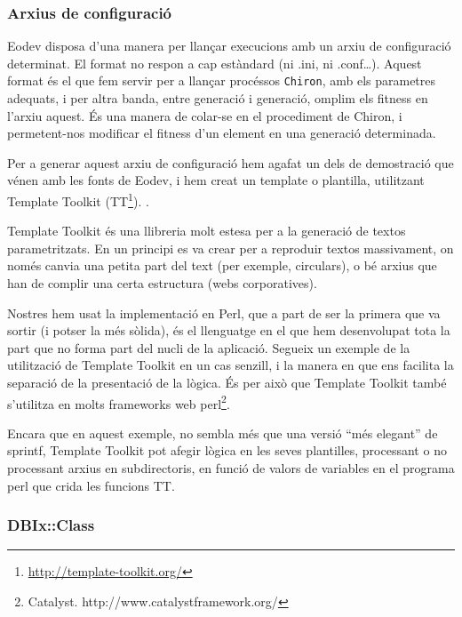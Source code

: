 \subsubsection{Arxius de configuració} %
\label{ssub:Arxius de configuracio}

Eodev disposa d'una manera per llançar execucions amb un arxiu de configuració
determinat.  El format no respon a cap estàndard (ni .ini, ni .conf\ldots).
Aquest format és el que fem servir per a llançar procéssos \texttt{Chiron}, amb
els parametres adequats, i per altra banda, entre generació i generació, omplim
els fitness en l'arxiu aquest.  És una manera de colar-se en el procediment de
Chiron, i permetent-nos modificar el fitness d'un element en una generació
determinada.

Per a generar aquest arxiu de configuració hem agafat un dels de demostració que
vénen amb les fonts de Eodev, i hem creat un template o plantilla, utilitzant
Template Toolkit (TT\footnote{\url{http://template-toolkit.org/}}).
\cite{CCW03}.

Template Toolkit és una llibreria molt estesa per a la generació de textos
parametritzats.  En un principi es va crear per a reproduir textos massivament,
on només canvia una petita part del text (per exemple, circulars), o bé arxius
que han de complir una certa estructura (webs corporatives).

Nostres hem usat la implementació en Perl, que a part de ser la primera que va
sortir (i potser la més sòlida), és el llenguatge en el que hem desenvolupat
tota la part que no forma part del nucli de la aplicació.  Segueix un exemple de
la utilització de Template Toolkit en un cas senzill, i la manera en que ens
facilita la separació de la presentació de la lògica.  És per això que Template
Toolkit també s'utilitza en molts frameworks web perl\footnote{Catalyst.
http://www.catalystframework.org/}.

\lstset{language=perl, tabsize=2}
\lstset{commentstyle=\textit}


Encara que en aquest exemple, no sembla més que una versió ``més elegant'' de
sprintf, Template Toolkit pot afegir lògica en les seves plantilles, processant
o no processant arxius en subdirectoris, en funció de valors de variables en el
programa perl que crida les funcions TT.


\subsubsection{DBIx::Class} %
\label{ssub:DBIx Class}


